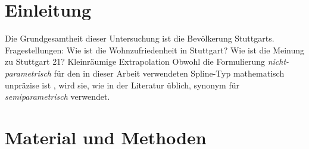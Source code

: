 \documentclass{Vorlage}
\begin{document}
\restoregeometry


\pagestyle{plain}

\tableofcontents %

\newpage %

\listoffigures %

\listoftables %

\newpage



\pagestyle{fancy}

\section{Einleitung}
Die Grundgesamtheit dieser Untersuchung ist die Bevölkerung Stuttgarts.
Fragestellungen: Wie ist die Wohnzufriedenheit in Stuttgart? Wie ist die Meinung zu Stuttgart 21? Kleinräumige Extrapolation
Obwohl die Formulierung \textit{nicht-parametrisch} für den in dieser Arbeit verwendeten Spline-Typ mathematisch unpräzise ist \cite[p. 1]{eilers1996}, wird sie, wie in der Literatur üblich, synonym für \textit{semiparametrisch} verwendet.

\newpage

\section{Material und Methoden}
\end{document}

